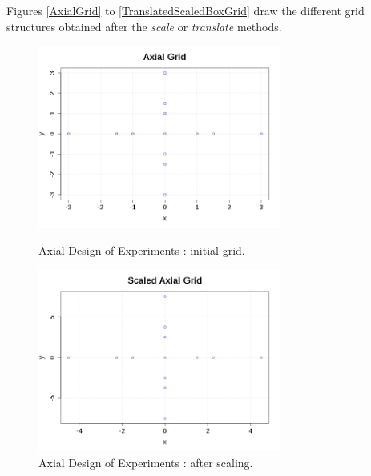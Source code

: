              Figures \ref{AxialGrid} to \ref{TranslatedScaledBoxGrid} draw the different grid structures obtained after the {\itshape scale} or {\itshape translate} methods.

             \begin{figure}[H]
               \begin{minipage}{10cm}
                 \begin{center}
                   \includegraphics[width=8cm]{Figures/AxialGrid.png}
                   \caption{Axial Design of Experiments  : initial grid.}
                   \label{AxialGrid}
                 \end{center}
               \end{minipage}
               \hfill
               \begin{minipage}{10cm}
                 \begin{center}
                   \includegraphics[width=8cm]{Figures/ScaledAxialGrid.png}
                   \caption{Axial Design of Experiments  : after scaling.}
                   \label{ScaledAxialGrid}
                 \end{center}
               \end{minipage}
             \end{figure}

